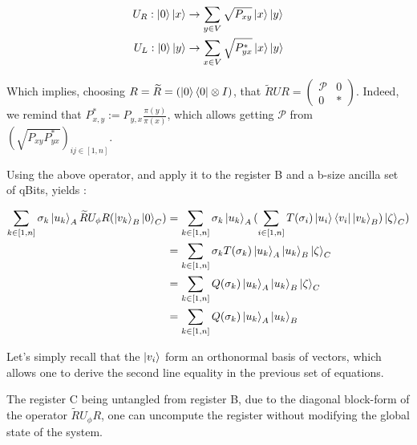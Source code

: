 \documentclass[sn-mathphys]{sn-jnl}%
\theoremstyle{thmstyleone}%
\theoremstyle{thmstyletwo}%
\theoremstyle{thmstylethree}%
\begin{document}
\begin{align}
    U_R : \ket{0} \ket{x} &\rightarrow \sum_{y \in V} \sqrt{P_{xy}} \ket{x} \ket{y} \\
    U_L : \ket{0} \ket{y} &\rightarrow \sum_{x \in V} \sqrt{P^*_{yx}} \ket{x} \ket{y}
\end{align}

Which implies, choosing $R = \widetilde{R} = (\ket{0}\bra{0} \otimes I)$, that $\widetilde{R}UR = \begin{pmatrix} \mathcal{P} & 0 \\ 0 & * \end{pmatrix}$. Indeed, we remind that $P^*_{x,y} := P_{y,x} \frac{\pi(y)}{\pi(x)}$, which allows getting $\mathcal{P}$ from $(\sqrt{P_{xy}P^*_{yx}})_{ij \in [1,n]}$.

Using the above operator, and apply it to the register B and a b-size ancilla set of qBits, yields :

\begin{align}
    \sum_{k\in [1,n]} \sigma_k \ket{u_k}_A \widetilde{R}U_\phi R (\ket{v_k}_B \ket{0}_C) &= \sum_{k\in [1,n]} \sigma_k \ket{u_k}_A  (\sum_{i \in [1,n]} T(\sigma_i) \ket{u_i}\bra{v_i}\ket{v_k}_B) \ket{\zeta}_C )\\
    &= \sum_{k\in [1,n]} \sigma_k T(\sigma_k) \ket{u_k}_A  \ket{u_k}_B \ket{\zeta}_C \\
    &= \sum_{k\in [1,n]} Q(\sigma_k) \ket{u_k}_A  \ket{u_k}_B \ket{\zeta}_C \\
    &= \sum_{k\in [1,n]} Q(\sigma_k) \ket{u_k}_A  \ket{u_k}_B
\end{align}

Let's simply recall that the $\ket{v_i}$ form an orthonormal basis of
vectors, which allows one to derive the second line equality in the
previous set of equations.

The register C being untangled from register B, due to the diagonal
block-form of the operator $\widetilde{R}U_\phi R$, one can uncompute
the register without modifying the global state of the system.
\end{document}
